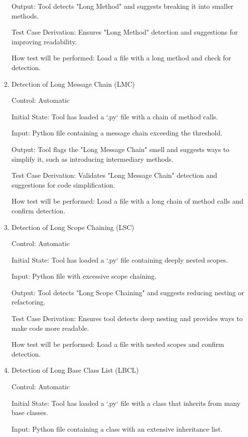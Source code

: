 \documentclass[12pt, titlepage]{article}
\begin{document}
\begin{enumerate}
Output: Tool detects "Long Method" and suggests breaking it into smaller methods.

Test Case Derivation: Ensures "Long Method" detection and suggestions for improving readability.
					
How test will be performed: Load a file with a long method and check for detection.

\item{Detection of Long Message Chain (LMC)\\}

Control: Automatic
					
Initial State: Tool has loaded a `.py` file with a chain of method calls.
					
Input: Python file containing a message chain exceeding the threshold.
					
Output: Tool flags the "Long Message Chain" smell and suggests ways to simplify it, such as introducing intermediary methods.

Test Case Derivation: Validates "Long Message Chain" detection and suggestions for code simplification.
					
How test will be performed: Load a file with a long chain of method calls and confirm detection.

\item{Detection of Long Scope Chaining (LSC)\\}

Control: Automatic
					
Initial State: Tool has loaded a `.py` file containing deeply nested scopes.
					
Input: Python file with excessive scope chaining.
					
Output: Tool detects "Long Scope Chaining" and suggests reducing nesting or refactoring.

Test Case Derivation: Ensures tool detects deep nesting and provides ways to make code more readable.
					
How test will be performed: Load a file with nested scopes and confirm detection.

\item{Detection of Long Base Class List (LBCL)\\}

Control: Automatic
					
Initial State: Tool has loaded a `.py` file with a class that inherits from many base classes.
					
Input: Python file containing a class with an extensive inheritance list.
					

\end{enumerate}
\end{document}

